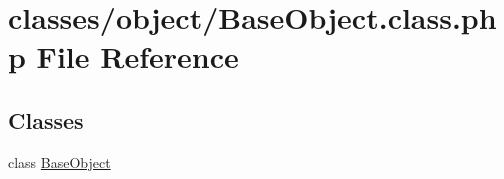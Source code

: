 \hypertarget{BaseObject_8class_8php}{\section{classes/object/\-Base\-Object.class.\-php File Reference}
\label{BaseObject_8class_8php}
}
\subsection*{Classes}
\begin{DoxyCompactItemize}
\item 
class \hyperlink{classBaseObject}{Base\-Object}
\end{DoxyCompactItemize}

